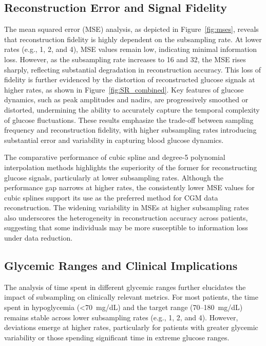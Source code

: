 \subsection{Reconstruction Error and Signal Fidelity}
The mean squared error (MSE) analysis, as depicted in Figure~\ref{fig:mses}, reveals that reconstruction fidelity is highly dependent on the subsampling rate. At lower rates (e.g., 1, 2, and 4), MSE values remain low, indicating minimal information loss. However, as the subsampling rate increases to 16 and 32, the MSE rises sharply, reflecting substantial degradation in reconstruction accuracy. This loss of fidelity is further evidenced by the distortion of reconstructed glucose signals at higher rates, as shown in Figure~\ref{fig:SR_combined}. Key features of glucose dynamics, such as peak amplitudes and nadirs, are progressively smoothed or distorted, undermining the ability to accurately capture the temporal complexity of glucose fluctuations.
These results emphasize the trade-off between sampling frequency and reconstruction fidelity, with higher subsampling rates introducing substantial error and variability in capturing blood glucose dynamics.

The comparative performance of cubic spline and degree-5 polynomial interpolation methods highlights the superiority of the former for reconstructing glucose signals, particularly at lower subsampling rates. Although the performance gap narrows at higher rates, the consistently lower MSE values for cubic splines support its use as the preferred method for CGM data reconstruction. The widening variability in MSEs at higher subsampling rates also underscores the heterogeneity in reconstruction accuracy across patients, suggesting that some individuals may be more susceptible to information loss under data reduction.

\subsection{Glycemic Ranges and Clinical Implications}
The analysis of time spent in different glycemic ranges further elucidates the impact of subsampling on clinically relevant metrics. For most patients, the time spent in hypoglycemia (\textless 70~mg/dL) and the target range (70--180~mg/dL) remains stable across lower subsampling rates (e.g., 1, 2, and 4). However, deviations emerge at higher rates, particularly for patients with greater glycemic variability or those spending significant time in extreme glucose ranges.

